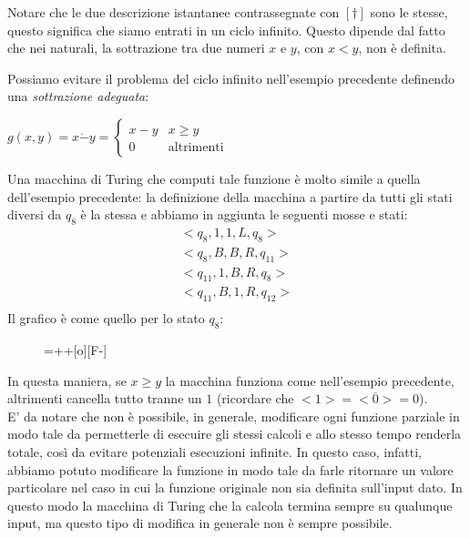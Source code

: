 \begin{esempio}[Sottrazione]
Notare che le due descrizione istantanee contrassegnate con $[\dag]$
sono le stesse, questo significa che siamo entrati in un ciclo
infinito. Questo dipende dal fatto che nei naturali, la sottrazione
tra due numeri $x$ e $y$, con $x<y$, non \`e definita.\\
\end{esempio}


\begin{esempio}
Possiamo evitare il problema del ciclo infinito nell'esempio
precedente definendo una \textsl{sottrazione adeguata}:\\
\begin{center}
$g(x,y)=x\dot{-} y=
\left\{ \begin{array}{ll}
x-y & x \geq y\\
0 & \textrm{altrimenti}
\end{array} \right.$
\end{center}
Una macchina di Turing che computi tale funzione \`e molto simile a
quella dell'esempio precedente: la definizione della macchina a
partire da tutti gli stati diversi da $q_{8}$ \`e la stessa e abbiamo
in aggiunta le seguenti mosse e stati:
\begin{eqnarray*}
&<q_{8},1,1,L,q_{8}>&\\
&<q_{8},B,B,R,q_{11}>&\\
&<q_{11},1,B,R,q_{8}>&\\
&<q_{11},B,1,R,q_{12}>&\\
\end{eqnarray*}
Il grafico \`e come quello per lo stato $q_{8}$:
\begin{figure}[hbtp]
\hspace{0cm} \entrymodifiers={++[o][F-]} \end{figure}\par
In questa maniera, se $x\geq y$ la macchina funziona come nell'esempio
precedente, altrimenti cancella tutto tranne un $1$ (ricordare che
$<1>=<\overline{0}>=0$).\\

E' da notare che non \`e possibile, in generale, modificare ogni
funzione parziale in modo tale da permetterle di esecuire gli stessi
calcoli e allo stesso tempo renderla totale, cos\`i da evitare
potenziali esecuzioni infinite. In questo caso, infatti, abbiamo
potuto modificare la funzione in modo tale da farle ritornare un
valore particolare nel caso in cui la funzione originale non sia
definita sull'input dato. In questo modo la macchina di Turing che la
calcola termina sempre su qualunque input, ma questo tipo di modifica
in generale non \`e sempre possibile.\\
\end{esempio}

